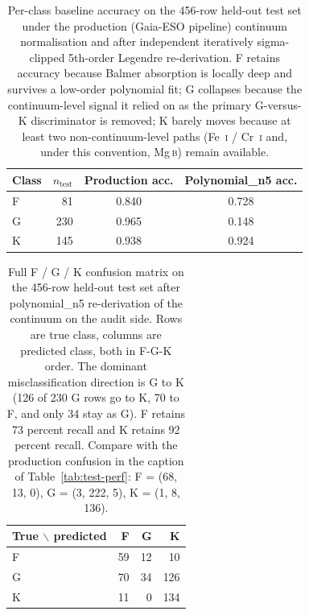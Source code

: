 \documentclass[11pt,a4paper]{article}
\newcommand{\Mgb}{Mg\,\textsc{b}\xspace}
\begin{document}
\begin{table}[ht]
\centering
\caption{Per-class baseline accuracy on the 456-row held-out test set under the production (Gaia-ESO pipeline) continuum normalisation and after independent iteratively sigma-clipped 5th-order Legendre re-derivation. F retains accuracy because Balmer absorption is locally deep and survives a low-order polynomial fit; G collapses because the continuum-level signal it relied on as the primary G-versus-K discriminator is removed; K barely moves because at least two non-continuum-level paths (Fe~\textsc{i} / Cr~\textsc{i} and, under this convention, \Mgb) remain available.}
\label{tab:a2_baseline}
\begin{tabular}{lrcc}
\toprule
Class & $n_{\mathrm{test}}$ & Production acc. & Polynomial\_n5 acc. \\
\midrule
F & 81  & 0.840 & 0.728 \\
G & 230 & 0.965 & 0.148 \\
K & 145 & 0.938 & 0.924 \\
\bottomrule
\end{tabular}
\end{table}

\begin{table}[ht]
\centering
\caption{Full F / G / K confusion matrix on the 456-row held-out test set after polynomial\_n5 re-derivation of the continuum on the audit side. Rows are true class, columns are predicted class, both in F-G-K order. The dominant misclassification direction is G to K (126 of 230 G rows go to K, 70 to F, and only 34 stay as G). F retains 73 percent recall and K retains 92 percent recall. Compare with the production confusion in the caption of Table~\ref{tab:test-perf}: F = (68, 13, 0), G = (3, 222, 5), K = (1, 8, 136).}
\label{tab:a2_confusion}
\begin{tabular}{lrrr}
\toprule
True $\backslash$ predicted & F & G & K \\
\midrule
F & 59 & 12 &  10 \\
G & 70 & 34 & 126 \\
K & 11 &  0 & 134 \\
\bottomrule
\end{tabular}
\end{table}
\end{document}
